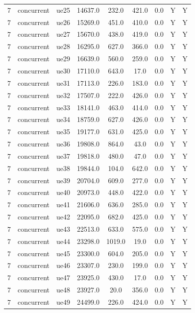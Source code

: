 \begin{table}[ht]
\begin{tabular}{|c|c|c|c|c|c|c|c|c|}
7 & concurrent & ue25 & 14637.0 & 232.0 & 421.0 & 0.0 & Y & Y \\
7 & concurrent & ue26 & 15269.0 & 451.0 & 410.0 & 0.0 & Y & Y \\
7 & concurrent & ue27 & 15670.0 & 438.0 & 419.0 & 0.0 & Y & Y \\
7 & concurrent & ue28 & 16295.0 & 627.0 & 366.0 & 0.0 & Y & Y \\
7 & concurrent & ue29 & 16639.0 & 560.0 & 259.0 & 0.0 & Y & Y \\
7 & concurrent & ue30 & 17110.0 & 643.0 & 17.0 & 0.0 & Y & Y \\
7 & concurrent & ue31 & 17113.0 & 226.0 & 183.0 & 0.0 & Y & Y \\
7 & concurrent & ue32 & 17507.0 & 222.0 & 426.0 & 0.0 & Y & Y \\
7 & concurrent & ue33 & 18141.0 & 463.0 & 414.0 & 0.0 & Y & Y \\
7 & concurrent & ue34 & 18759.0 & 627.0 & 426.0 & 0.0 & Y & Y \\
7 & concurrent & ue35 & 19177.0 & 631.0 & 425.0 & 0.0 & Y & Y \\
7 & concurrent & ue36 & 19808.0 & 864.0 & 43.0 & 0.0 & Y & Y \\
7 & concurrent & ue37 & 19818.0 & 480.0 & 47.0 & 0.0 & Y & Y \\
7 & concurrent & ue38 & 19844.0 & 104.0 & 642.0 & 0.0 & Y & Y \\
7 & concurrent & ue39 & 20704.0 & 609.0 & 277.0 & 0.0 & Y & Y \\
7 & concurrent & ue40 & 20973.0 & 448.0 & 422.0 & 0.0 & Y & Y \\
7 & concurrent & ue41 & 21606.0 & 636.0 & 285.0 & 0.0 & Y & Y \\
7 & concurrent & ue42 & 22095.0 & 682.0 & 425.0 & 0.0 & Y & Y \\
7 & concurrent & ue43 & 22513.0 & 633.0 & 575.0 & 0.0 & Y & Y \\
7 & concurrent & ue44 & 23298.0 & 1019.0 & 19.0 & 0.0 & Y & Y \\
7 & concurrent & ue45 & 23300.0 & 604.0 & 205.0 & 0.0 & Y & Y \\
7 & concurrent & ue46 & 23307.0 & 230.0 & 199.0 & 0.0 & Y & Y \\
7 & concurrent & ue47 & 23925.0 & 430.0 & 17.0 & 0.0 & Y & Y \\
7 & concurrent & ue48 & 23927.0 & 20.0 & 356.0 & 0.0 & Y & Y \\
7 & concurrent & ue49 & 24499.0 & 226.0 & 424.0 & 0.0 & Y & Y \\

\end{tabular}
\end{table}
